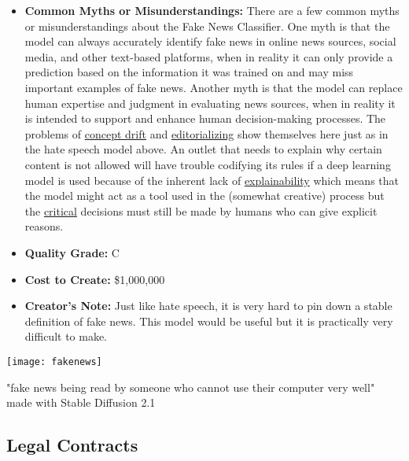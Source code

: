 \begin{itemize}
    \item \textbf{Common Myths or Misunderstandings:} There are a few common myths or misunderstandings about the Fake News Classifier. One myth is that the model can always accurately identify fake news in online news sources, social media, and other text-based platforms, when in reality it can only provide a prediction based on the information it was trained on and may miss important examples of fake news. Another myth is that the model can replace human expertise and judgment in evaluating news sources, when in reality it is intended to support and enhance human decision-making processes. The problems of \hyperref[sec:drift]{concept drift} and \hyperref[sec:janitor]{editorializing} show themselves here just as in the hate speech model above. An outlet that needs to explain why certain content is not allowed will have trouble codifying its rules if a deep learning model is used because of the inherent lack of \hyperref[sec:explain]{explainability} which means that the model might act as a tool used in the (somewhat creative) process but the \hyperref[sec:creative]{critical} decisions must still be made by humans who can give explicit reasons.
    \item \textbf{Quality Grade:} C
    \item \textbf{Cost to Create:} \$1,000,000
    \item \textbf{Creator's Note:} Just like hate speech, it is very hard to pin down a stable definition of fake news. This model would be useful but it is practically very difficult to make.
\end{itemize}

\begin{pdf}
\begin{marginfigure}[-5.5cm]
        \texttt{[image: fakenews]}
        \caption{"fake news being read by someone who cannot use their computer very well" made with Stable Diffusion 2.1}
\end{marginfigure}
\end{pdf}

\subsection{Legal Contracts}

